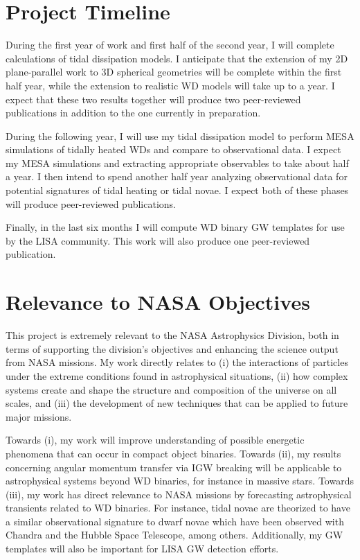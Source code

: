 \documentclass[12pt,
        usenames, %
        dvipsnames %
    ]{article}
\begin{document}
\section{Project Timeline}

During the first year of work and first half of the second year, I will complete
calculations of tidal dissipation models. I anticipate that the extension of my
2D plane-parallel work to 3D spherical geometries will be complete within the
first half year, while the extension to realistic WD models will take up to a
year. I expect that these two results together will produce two peer-reviewed
publications in addition to the one currently in preparation.

During the following year, I will use my tidal dissipation model to perform MESA
simulations of tidally heated WDs and compare to observational data. I expect my
MESA simulations and extracting appropriate observables to take about half a
year. I then intend to spend another half year analyzing observational data for
potential signatures of tidal heating or tidal novae. I expect both of these
phases will produce peer-reviewed publications.

Finally, in the last six months I will compute WD binary GW templates for use by
the LISA community. This work will also produce one peer-reviewed publication.

\section{Relevance to NASA Objectives}

This project is extremely relevant to the NASA Astrophysics Division, both in
terms of supporting the division's objectives and enhancing the science output
from NASA missions. My work directly relates to (i) the interactions of
particles under the extreme conditions found in astrophysical situations, (ii)
how complex systems create and shape the structure and composition of the
universe on all scales, and (iii) the development of new techniques that can be
applied to future major missions.

Towards (i), my work will improve understanding of possible energetic phenomena
that can occur in compact object binaries. Towards (ii), my results concerning
angular momentum transfer via IGW breaking will be applicable to astrophysical
systems beyond WD binaries, for instance in massive stars\cite{l_trans_rev}.
Towards (iii), my work has direct relevance to NASA missions by forecasting
astrophysical transients related to WD binaries. For instance, tidal novae are
theorized to have a similar observational signature to dwarf novae which have
been observed with Chandra and the Hubble Space Telescope, among others.
Additionally, my GW templates will also be important for LISA GW detection
efforts.

\clearpage

\printbibliography
\end{document}
